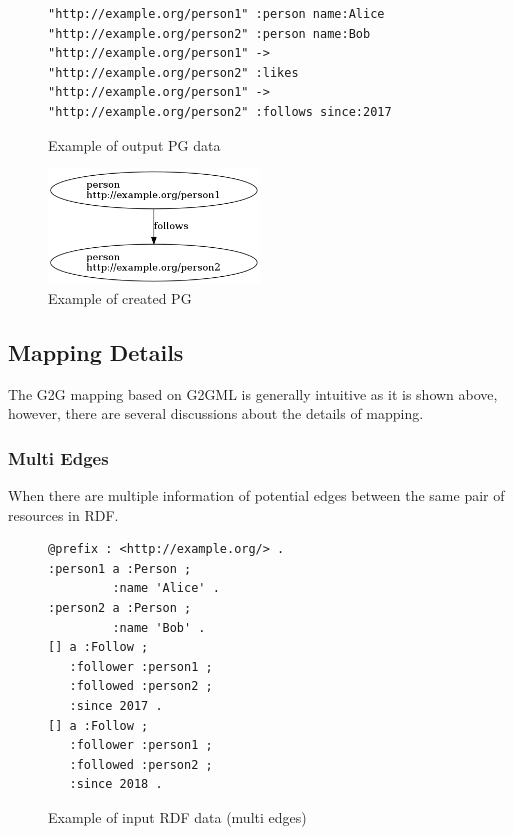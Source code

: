 \documentclass[runningheads]{llncs}
\begin{document}
\begin{figure}[!t]
\begin{scriptsize}
\begin{verbatim}
"http://example.org/person1" :person name:Alice
"http://example.org/person2" :person name:Bob
"http://example.org/person1" -> "http://example.org/person2" :likes
"http://example.org/person1" -> "http://example.org/person2" :follows since:2017
\end{verbatim}
\end{scriptsize}
\caption{Example of output PG data}
\label{fig:example-pg}
\end{figure}

\begin{figure}
\center
\includegraphics[width=0.5\textwidth]{pg_example5.png}
\caption{Example of created PG}
\label{fig:pg_example5}
\end{figure}

\subsection{Mapping Details}
The G2G mapping based on G2GML is generally intuitive as it is shown above, however, there are several discussions about the details of mapping.

\subsubsection{Multi Edges}
When there are multiple information of potential edges between the same pair of resources in RDF.


\begin{figure}[!t]
\begin{scriptsize}
\begin{verbatim}
@prefix : <http://example.org/> .
:person1 a :Person ;
         :name 'Alice' .
:person2 a :Person ;
         :name 'Bob' .
[] a :Follow ;
   :follower :person1 ;
   :followed :person2 ;
   :since 2017 .
[] a :Follow ;
   :follower :person1 ;
   :followed :person2 ;
   :since 2018 .
\end{verbatim}
\end{scriptsize}
\caption{Example of input RDF data (multi edges)}
\label{fig:example-rdf2}
\end{figure}
\end{document}

